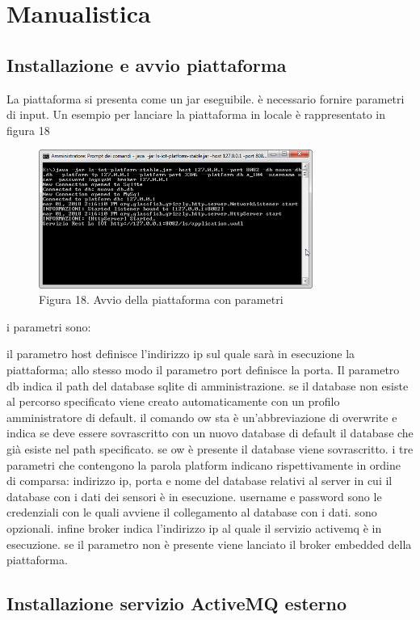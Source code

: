 \section{Manualistica}
\subsection{Installazione e avvio piattaforma}
La piattaforma si presenta come un jar eseguibile. è necessario fornire parametri di input. Un esempio per lanciare la piattaforma in locale è rappresentato in figura 18
\begin{figure}[h]
			\centering
			\includegraphics[width=0.8\textwidth]{lancio-piattaforma.png}
			\caption*{Figura 18. Avvio della piattaforma con parametri}
\end{figure}

i parametri sono:
{\selectfont
	
}
il parametro host definisce l'indirizzo ip sul quale sarà in esecuzione la piattaforma; allo stesso modo il parametro port definisce la porta.
Il parametro db indica il path del database sqlite di amministrazione. se il database non esiste al percorso specificato viene creato automaticamente con un profilo amministratore di default. il comando ow sta è un'abbreviazione di overwrite e indica se deve essere sovrascritto con un nuovo database di default il database che già esiste nel path specificato. se ow è presente il database viene sovrascritto.
i tre parametri che contengono la parola platform indicano rispettivamente in ordine di comparsa: indirizzo ip, porta e nome del database relativi al server in cui il database con i dati dei sensori è in esecuzione.
username e password sono le credenziali con le quali avviene il collegamento al database con i dati. sono opzionali. infine broker indica l'indirizzo ip al quale il servizio activemq è in esecuzione. se il parametro non è presente viene lanciato il broker embedded della piattaforma.
\subsection{Installazione servizio ActiveMQ esterno}

